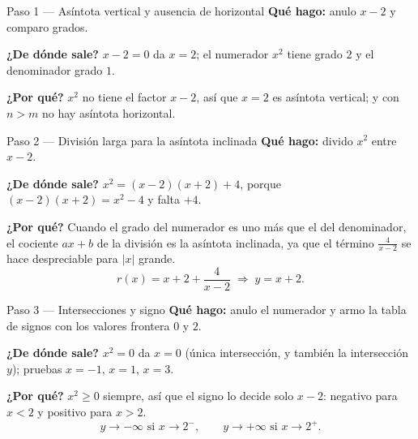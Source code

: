 \documentclass[11pt]{article}
\begin{document}
\begin{paso}{Paso 1 --- Asíntota vertical y ausencia de horizontal}
\textbf{Qué hago:} anulo $x-2$ y comparo grados.

\textbf{¿De dónde sale?} $x-2=0$ da $x=2$; el numerador $x^2$ tiene grado $2$ y el denominador grado $1$.

\textbf{¿Por qué?} $x^2$ no tiene el factor $x-2$, así que $x=2$ es asíntota vertical; y con $n>m$ no hay asíntota horizontal.
\end{paso}

\begin{paso}{Paso 2 --- División larga para la asíntota inclinada}
\textbf{Qué hago:} divido $x^2$ entre $x-2$.

\textbf{¿De dónde sale?} $x^2=(x-2)(x+2)+4$, porque $(x-2)(x+2)=x^2-4$ y falta $+4$.

\textbf{¿Por qué?} Cuando el grado del numerador es uno más que el del denominador, el cociente $ax+b$ de la división es la asíntota inclinada, ya que el término $\frac{4}{x-2}$ se hace despreciable para $|x|$ grande.
\[
r(x)=x+2+\frac{4}{x-2}\;\Longrightarrow\; y=x+2 .
\]
\end{paso}

\begin{paso}{Paso 3 --- Intersecciones y signo}
\textbf{Qué hago:} anulo el numerador y armo la tabla de signos con los valores frontera $0$ y $2$.

\textbf{¿De dónde sale?} $x^2=0$ da $x=0$ (única intersección, y también la intersección $y$); pruebas $x=-1$, $x=1$, $x=3$.

\textbf{¿Por qué?} $x^2\ge 0$ siempre, así que el signo lo decide solo $x-2$: negativo para $x<2$ y positivo para $x>2$.
\[
y\to-\infty \text{ si } x\to 2^-,\qquad y\to+\infty \text{ si } x\to 2^+ .
\]
\end{paso}

\begin{center}
\end{center}
\end{document}
